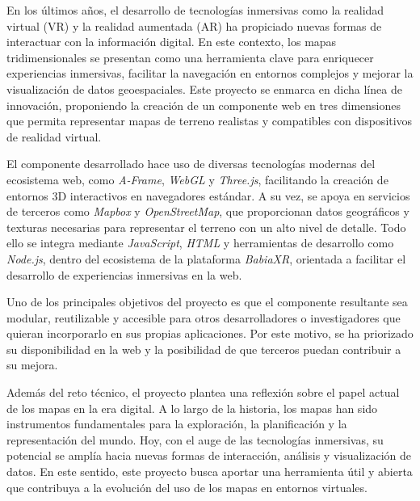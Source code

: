 \documentclass[a4paper, 12pt]{book}
\begin{document}
En los últimos años, el desarrollo de tecnologías inmersivas como la realidad virtual (VR) y la realidad aumentada (AR) ha propiciado nuevas formas de interactuar con la información digital. En este contexto, los mapas tridimensionales se presentan como una herramienta clave para enriquecer experiencias inmersivas, facilitar la navegación en entornos complejos y mejorar la visualización de datos geoespaciales. Este proyecto se enmarca en dicha línea de innovación, proponiendo la creación de un componente web en tres dimensiones que permita representar mapas de terreno realistas y compatibles con dispositivos de realidad virtual.

El componente desarrollado hace uso de diversas tecnologías modernas del ecosistema web, como \textit{A-Frame}, \textit{WebGL} y \textit{Three.js}, facilitando la creación de entornos 3D interactivos en navegadores estándar. A su vez, se apoya en servicios de terceros como \textit{Mapbox} y \textit{OpenStreetMap}, que proporcionan datos geográficos y texturas necesarias para representar el terreno con un alto nivel de detalle. Todo ello se integra mediante \textit{JavaScript}, \textit{HTML} y herramientas de desarrollo como \textit{Node.js}, dentro del ecosistema de la plataforma \textit{BabiaXR}, orientada a facilitar el desarrollo de experiencias inmersivas en la web.

Uno de los principales objetivos del proyecto es que el componente resultante sea modular, reutilizable y accesible para otros desarrolladores o investigadores que quieran incorporarlo en sus propias aplicaciones. Por este motivo, se ha priorizado su disponibilidad en la web y la posibilidad de que terceros puedan contribuir a su mejora.

Además del reto técnico, el proyecto plantea una reflexión sobre el papel actual de los mapas en la era digital. A lo largo de la historia, los mapas han sido instrumentos fundamentales para la exploración, la planificación y la representación del mundo. Hoy, con el auge de las tecnologías inmersivas, su potencial se amplía hacia nuevas formas de interacción, análisis y visualización de datos. En este sentido, este proyecto busca aportar una herramienta útil y abierta que contribuya a la evolución del uso de los mapas en entornos virtuales.

\end{document}
